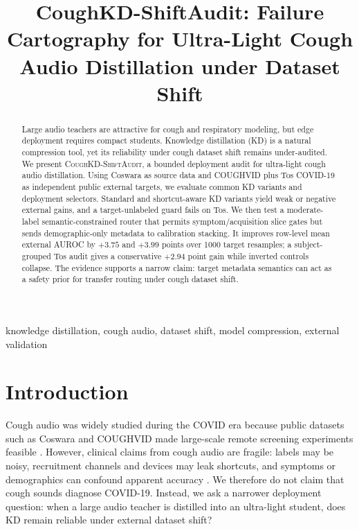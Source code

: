 \documentclass{article}
\title{CoughKD-ShiftAudit: Failure Cartography for Ultra-Light Cough Audio Distillation under Dataset Shift}
\newcommand{\method}{\textsc{CoughKD-ShiftAudit}}
\begin{document}
\maketitle

\begin{abstract}
Large audio teachers are attractive for cough and respiratory modeling, but edge deployment requires compact students. Knowledge distillation (KD) is a natural compression tool, yet its reliability under cough dataset shift remains under-audited. We present \method, a bounded deployment audit for ultra-light cough audio distillation. Using Coswara as source data and COUGHVID plus Tos COVID-19 as independent public external targets, we evaluate common KD variants and deployment selectors. Standard and shortcut-aware KD variants yield weak or negative external gains, and a target-unlabeled guard fails on Tos. We then test a moderate-label semantic-constrained router that permits symptom/acquisition slice gates but sends demographic-only metadata to calibration stacking. It improves row-level mean external AUROC by $+3.75$ and $+3.99$ points over 1000 target resamples; a subject-grouped Tos audit gives a conservative $+2.94$ point gain while inverted controls collapse. The evidence supports a narrow claim: target metadata semantics can act as a safety prior for transfer routing under cough dataset shift.
\end{abstract}

\begin{keywords}
knowledge distillation, cough audio, dataset shift, model compression, external validation
\end{keywords}

\section{Introduction}
Cough audio was widely studied during the COVID era because public datasets such as Coswara and COUGHVID made large-scale remote screening experiments feasible \cite{bhattacharya2023coswara,orlandic2021coughvid}. However, clinical claims from cough audio are fragile: labels may be noisy, recruitment channels and devices may leak shortcuts, and symptoms or demographics can confound apparent accuracy \cite{han2022sounds,coppock2024nmi,zimmer2026coughacoustic}. We therefore do not claim that cough sounds diagnose COVID-19. Instead, we ask a narrower deployment question: when a large audio teacher is distilled into an ultra-light student, does KD remain reliable under external dataset shift?
\end{document}

